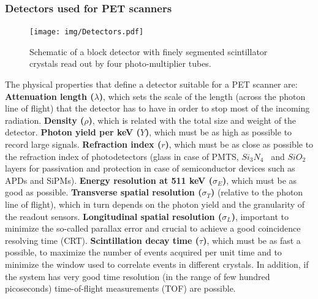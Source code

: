 \subsubsection*{Detectors used for PET scanners}

\begin{figure}[!bthp]
	\centering
	\texttt{[image: img/Detectors.pdf]}
	\caption{\label{fig.detector} Schematic of a block detector with finely segmented scintillator crystals read out
by four photo-multiplier tubes.}
\end{figure}


The physical properties that define a detector suitable for a PET scanner are: 
{\bf Attenuation length ($\lambda$)}, which sets the scale of the length (across the photon line of flight) that the detector has to have in order to stop most of the incoming radiation.
{\bf Density ($\rho$)}, which is related with the total size and weight of the detector.
{\bf Photon yield per keV ($Y$)}, which must be as high as possible to record large signals. 
{\bf Refraction index ($r$)}, which must be as close as possible to the refraction index of photodetectors (glass in case of PMTS, $Si_3N_4$~ and $SiO_2$ layers for passivation and protection in case of semiconductor devices such as APDs and SiPMs). 
{\bf Energy resolution at 511 keV ($\sigma_E$)}, which must be as good as possible. 
{\bf Transverse spatial resolution ($\sigma_T$)} (relative to the photon line of flight), which in turn depends on the photon yield and the granularity of the readout sensors.
{\bf Longitudinal spatial resolution ($\sigma_L$)}, important to minimize the so-called parallax error and crucial to achieve a good coincidence resolving time (CRT).   
{\bf Scintillation decay time ($\tau$)}, which must be as fast a possible, to maximize the number of events acquired per unit time and to minimize the window used to correlate events in different crystals. In addition, if the system has very good time resolution (in the range of few hundred picoseconds) time-of-flight measurements (TOF) are possible. 

